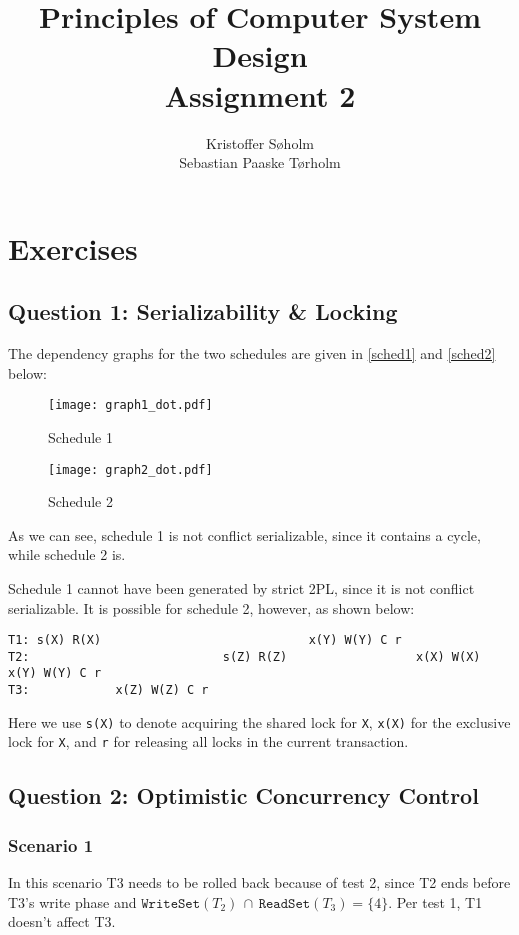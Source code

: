 \documentclass[11pt,a4paper]{article}
\title{Principles of Computer System Design\\Assignment 2}
\author{Kristoffer Søholm\\Sebastian Paaske Tørholm}
\begin{document}
\maketitle

\section{Exercises}
\subsection{Question 1: Serializability \& Locking}
The dependency graphs for the two schedules are given in \autoref{sched1} and
\autoref{sched2} below:

\begin{figure}[h!]
    \texttt{[image: graph1\_dot.pdf]}
\centering
\caption{Schedule 1}
\label{sched1}
\end{figure}

\begin{figure}[h!]
    \texttt{[image: graph2\_dot.pdf]}
\centering
\caption{Schedule 2}
\label{sched2}
\end{figure}

As we can see, schedule 1 is not conflict serializable, since it contains a
cycle, while schedule 2 is.

Schedule 1 cannot have been generated by strict 2PL, since it is not conflict
serializable. It is possible for schedule 2, however, as shown below:

\begin{verbatim}
T1: s(X) R(X)                             x(Y) W(Y) C r
T2:                           s(Z) R(Z)                  x(X) W(X) x(Y) W(Y) C r
T3:            x(Z) W(Z) C r
\end{verbatim}

Here we use \texttt{s(X)} to denote acquiring the shared lock for \texttt{X},
\texttt{x(X)} for the exclusive lock for \texttt{X}, and \texttt{r} for
releasing all locks in the current transaction.

\subsection{Question 2: Optimistic Concurrency Control}
\subsubsection{Scenario 1}
In this scenario T3 needs to be rolled back because of test 2, since
T2 ends before T3's write phase and $\mathtt{WriteSet}(T_2) \,\cap\,
\mathtt{ReadSet}(T_3) = \{4\}$. Per test 1, T1 doesn't affect T3.
\end{document}
